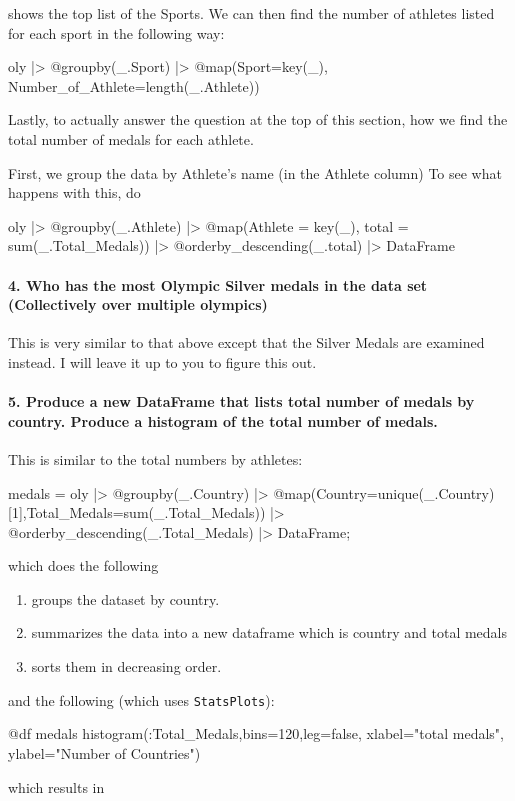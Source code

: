shows the top list of the Sports. We can then find the number of
athletes listed for each sport in the following way:

\begin{jlblock}[data]
oly |>
  @groupby(_.Sport) |>
  @map({Sport=key(_), Number_of_Athlete=length(_.Athlete)})
\end{jlblock}

Lastly, to actually answer the question at the top of this section, how
we find the total number of medals for each athlete.

First, we group the data by Athlete's name (in the Athlete column) To
see what happens with this, do

\begin{jlblock}[data]
oly |>
  @groupby(_.Athlete) |>
  @map({Athlete = key(_), total = sum(_.Total_Medals)}) |>
  @orderby_descending(_.total) |>
  DataFrame
\end{jlblock}

\paragraph{4. Who has the most Olympic Silver medals in the data set
(Collectively over multiple olympics)}

This is very similar to that above except that the Silver Medals are
examined instead. I will leave it up to you to figure this out.

\paragraph{5. Produce a new DataFrame that lists total number of medals by country. Produce a histogram of the total number of medals.}

This is similar to the total numbers by athletes:

\begin{jlblock}[data]
medals = oly |>
  @groupby(_.Country) |>
  @map({Country=unique(_.Country)[1],Total_Medals=sum(_.Total_Medals)})  |>
  @orderby_descending(_.Total_Medals) |>
  DataFrame;
\end{jlblock}

which does the following

\begin{enumerate}
\item  groups the dataset by country.
\item  summarizes the data into a new dataframe which is country and total medals
\item  sorts them in decreasing order.
\end{enumerate}
%
and the following (which uses \texttt{StatsPlots}):
%
\begin{jlblock}[data]
@df medals histogram(:Total_Medals,bins=120,leg=false,
					xlabel="total medals", ylabel="Number of Countries")
\end{jlblock}
%
which results in
%
\begin{center}
\pgfplotsset{scale=0.8}
\end{center}

